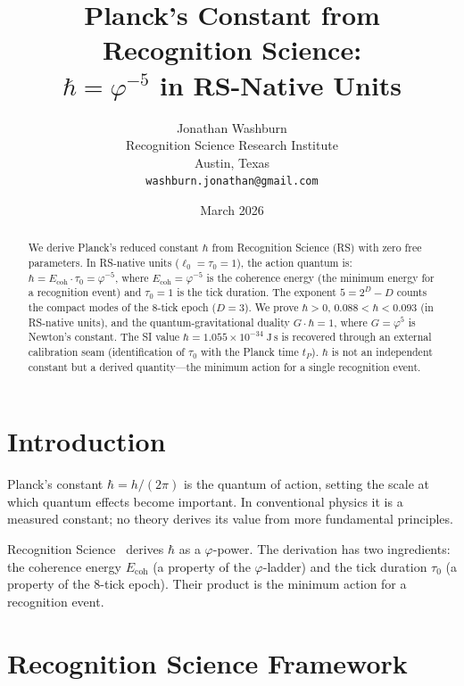 \documentclass[12pt,a4paper]{article}
\title{Planck's Constant from Recognition Science:\\
$\hbar = \varphi^{-5}$ in RS-Native Units}
\author{Jonathan Washburn\\
Recognition Science Research Institute\\
Austin, Texas\\
\texttt{washburn.jonathan@gmail.com}}
\date{March 2026}
\theoremstyle{definition}
\theoremstyle{remark}
\begin{document}
\maketitle

\begin{abstract}
We derive Planck's reduced constant $\hbar$ from Recognition
Science (RS) with zero free parameters.  In RS-native units
($\ell_0 = \tau_0 = 1$), the action quantum is:
$\hbar = E_{\mathrm{coh}} \cdot \tau_0 = \varphi^{-5}$,
where $E_{\mathrm{coh}} = \varphi^{-5}$ is the coherence energy
(the minimum energy for a recognition event) and $\tau_0 = 1$ is
the tick duration.  The exponent $5 = 2^D - D$ counts the compact
modes of the 8-tick epoch ($D = 3$).  We prove $\hbar > 0$,
$0.088 < \hbar < 0.093$ (in RS-native units), and the
quantum-gravitational duality $G \cdot \hbar = 1$, where
$G = \varphi^5$ is Newton's constant.  The SI value
$\hbar = 1.055 \times 10^{-34}\;\mathrm{J\,s}$ is recovered
through an external calibration seam (identification of
$\tau_0$ with the Planck time $t_P$).  $\hbar$ is not an
independent constant but a derived quantity---the minimum action
for a single recognition event.
\end{abstract}

\section{Introduction}
\label{sec:intro}

Planck's constant $\hbar = h/(2\pi)$ is the quantum of action,
setting the scale at which quantum effects become important.  In
conventional physics it is a measured constant; no theory derives
its value from more fundamental principles.

Recognition Science~\cite{RS_Axioms} derives $\hbar$ as a
$\varphi$-power.  The derivation has two ingredients: the
coherence energy $E_{\mathrm{coh}}$ (a property of the
$\varphi$-ladder) and the tick duration $\tau_0$ (a property of
the 8-tick epoch).  Their product is the minimum action for a
recognition event.

\section{Recognition Science Framework}
\label{sec:framework}
\end{document}
